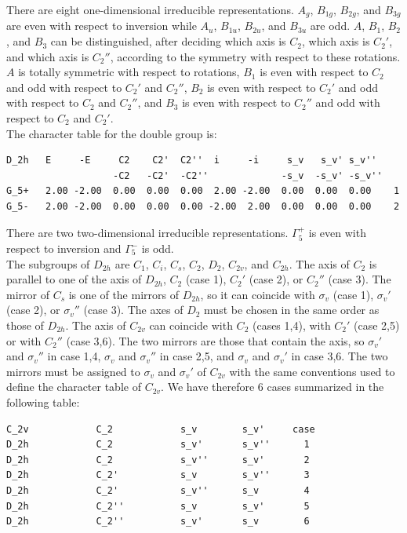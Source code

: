 \documentclass[12pt,a4paper]{article}
\begin{document}
There are eight one-dimensional irreducible representations. $A_g$, $B_{1g}$,
$B_{2g}$, and $B_{3g}$ are even with respect to inversion while $A_u$, $B_{1u}$,
$B_{2u}$, and $B_{3u}$ are odd. $A$, $B_1$, $B_2$, and $B_3$ can be distinguished,
after deciding which axis is $C_2$, which axis is $C_2'$, and which axis
is $C_2''$, according to the symmetry with respect to these rotations.
$A$ is totally symmetric with respect to rotations, $B_1$ is even with
respect to $C_2$ and odd with respect to $C_2'$ and $C_2''$, 
$B_2$ is even with respect to $C_2'$ and odd with respect to $C_2$ and $C_2''$,
and $B_3$ is even with respect to $C_2''$ and odd with respect to
$C_2$ and $C_2'$.\\
The character table for the double group is:
\begin{verbatim}
D_2h   E     -E     C2    C2'  C2''  i     -i     s_v   s_v' s_v''
                   -C2   -C2'  -C2''             -s_v  -s_v' -s_v''
G_5+   2.00 -2.00  0.00  0.00  0.00  2.00 -2.00  0.00  0.00  0.00    1
G_5-   2.00 -2.00  0.00  0.00  0.00 -2.00  2.00  0.00  0.00  0.00    2
\end{verbatim}
There are two two-dimensional irreducible representations. $\Gamma_5^+$ is 
even with respect to inversion and $\Gamma_5^-$ is odd. \\
The subgroups of $D_{2h}$ are $C_1$, $C_i$, $C_s$, $C_2$, $D_2$, $C_{2v}$, and
$C_{2h}$. The axis of $C_2$ is parallel to one of
the axis of $D_{2h}$, $C_2$ (case 1), $C_2'$ (case 2), or $C_2''$ (case 3). 
The mirror of $C_s$ is one of the mirrors of $D_{2h}$,
so it can coincide with $\sigma_v$ (case 1), $\sigma_v'$ (case 2), or
$\sigma_v''$ (case 3). The axes of $D_2$ must be chosen in the same order
as those of $D_{2h}$. The axis of $C_{2v}$ can coincide with $C_2$
(cases 1,4), with $C_2'$ (case 2,5) or with $C_2''$ (case 3,6). The two mirrors
are those that contain the axis, so $\sigma_v'$ and $\sigma_v''$
in case 1,4, $\sigma_v$ and $\sigma_v''$ in case 2,5, and $\sigma_v$ and 
$\sigma_v'$ in case 3,6. The two mirrors must be assigned to $\sigma_v$ and
$\sigma_v'$ of $C_{2v}$ with the same conventions used to define the character 
table of $C_{2v}$. We have therefore $6$ cases summarized in the following table:
\begin{verbatim}
C_2v            C_2            s_v        s_v'     case
D_2h            C_2            s_v'       s_v''      1
D_2h            C_2            s_v''      s_v'       2
D_2h            C_2'           s_v        s_v''      3 
D_2h            C_2'           s_v''      s_v        4
D_2h            C_2''          s_v        s_v'       5
D_2h            C_2''          s_v'       s_v        6
\end{verbatim}
\end{document}
